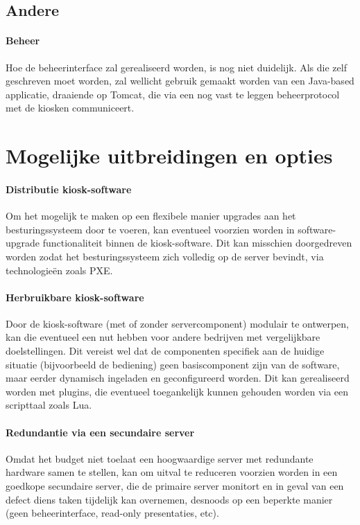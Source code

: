 \documentclass[a4paper,oneside,11pt,final]{memoir}
\begin{document}
\subsection{Andere}

\paragraph{Beheer} Hoe de beheerinterface zal gerealiseerd worden, is nog niet duidelijk. Als die zelf geschreven moet worden, zal wellicht gebruik gemaakt worden van een Java-based applicatie, draaiende op Tomcat, die via een nog vast te leggen beheerprotocol met de kiosken communiceert.


\section{Mogelijke uitbreidingen en opties}

\paragraph{Distributie kiosk-software} Om het mogelijk te maken op een flexibele manier upgrades aan het besturingssysteem door te voeren, kan eventueel voorzien worden in software-upgrade functionaliteit binnen de kiosk-software. Dit kan misschien doorgedreven worden zodat het besturingssysteem zich volledig op de server bevindt, via technologieën zoals PXE.

\paragraph{Herbruikbare kiosk-software} Door de kiosk-software (met of zonder servercomponent) modulair te ontwerpen, kan die eventueel een nut hebben voor andere bedrijven met vergelijkbare doelstellingen. Dit vereist wel dat de componenten specifiek aan de huidige situatie (bijvoorbeeld de bediening) geen basiscomponent zijn van de software, maar eerder dynamisch ingeladen en geconfigureerd worden. Dit kan gerealiseerd worden met plugins, die eventueel toegankelijk kunnen gehouden worden via een scripttaal zoals Lua.

\paragraph{Redundantie via een secundaire server} Omdat het budget niet toelaat een hoogwaardige server met redundante hardware samen te stellen, kan om uitval te reduceren voorzien worden in een goedkope secundaire server, die de primaire server monitort en in geval van een defect diens taken tijdelijk kan overnemen, desnoods op een beperkte manier (geen beheerinterface, read-only presentaties, etc).
\end{document}
